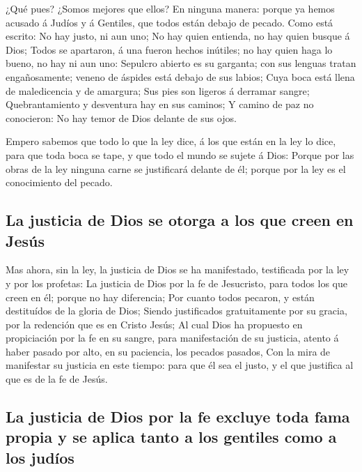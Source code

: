  ¿Qué pues? ¿Somos mejores que ellos? En ninguna manera:
porque ya hemos acusado á Judíos y á Gentiles, que todos están debajo de
pecado.  Como está escrito: No hay justo, ni aun uno;
 No hay quien entienda, no hay quien busque á Dios;
 Todos se apartaron, á una fueron hechos inútiles; no hay
quien haga lo bueno, no hay ni aun uno:  Sepulcro abierto
es su garganta; con sus lenguas tratan engañosamente; veneno de áspides
está debajo de sus labios;  Cuya boca está llena de
maledicencia y de amargura;  Sus pies son ligeros á
derramar sangre;  Quebrantamiento y desventura hay en sus
caminos;  Y camino de paz no conocieron: 
No hay temor de Dios delante de sus ojos.

 Empero sabemos que todo lo que la ley dice, á los que
están en la ley lo dice, para que toda boca se tape, y que todo el mundo
se sujete á Dios:  Porque por las obras de la ley ninguna
carne se justificará delante de él; porque por la ley es el conocimiento
del pecado.

\hypertarget{la-justicia-de-dios-se-otorga-a-los-que-creen-en-jesuxfas}{%
\subsection{La justicia de Dios se otorga a los que creen en
Jesús}\label{la-justicia-de-dios-se-otorga-a-los-que-creen-en-jesuxfas}}

 Mas ahora, sin la ley, la justicia de Dios se ha
manifestado, testificada por la ley y por los profetas: 
La justicia de Dios por la fe de Jesucristo, para todos los que creen en
él; porque no hay diferencia;  Por cuanto todos pecaron,
y están destituídos de la gloria de Dios;  Siendo
justificados gratuitamente por su gracia, por la redención que es en
Cristo Jesús;  Al cual Dios ha propuesto en propiciación
por la fe en su sangre, para manifestación de su justicia, atento á
haber pasado por alto, en su paciencia, los pecados pasados,
 Con la mira de manifestar su justicia en este tiempo:
para que él sea el justo, y el que justifica al que es de la fe de
Jesús.

\hypertarget{la-justicia-de-dios-por-la-fe-excluye-toda-fama-propia-y-se-aplica-tanto-a-los-gentiles-como-a-los-juduxedos}{%
\subsection{La justicia de Dios por la fe excluye toda fama propia y se
aplica tanto a los gentiles como a los
judíos}\label{la-justicia-de-dios-por-la-fe-excluye-toda-fama-propia-y-se-aplica-tanto-a-los-gentiles-como-a-los-juduxedos}}

